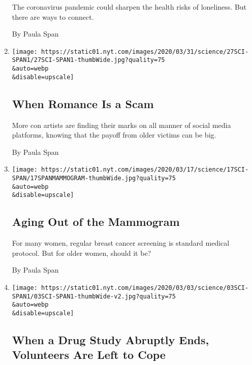 \begin{enumerate}
  The coronavirus pandemic could sharpen the health risks of loneliness.
  But there are ways to connect.

  By Paula Span
\item
  \href{/2020/03/27/well/elderly-romance-scam.html}{}

  \texttt{[image: https://static01.nyt.com/images/2020/03/31/science/27SCI-SPAN1/27SCI-SPAN1-thumbWide.jpg?quality=75\\\&auto=webp\\\&disable=upscale]}

  \hypertarget{when-romance-is-a-scam}{%
  \subsection{When Romance Is a Scam}\label{when-romance-is-a-scam}}

  More con artists are finding their marks on all manner of social media
  platforms, knowing that the payoff from older victims can be big.

  By Paula Span
\item
  \href{/2020/03/16/health/breastcancer-elderly-old-age.html}{}

  \texttt{[image: https://static01.nyt.com/images/2020/03/17/science/17SCI-SPAN/17SPANMAMMOGRAM-thumbWide.jpg?quality=75\\\&auto=webp\\\&disable=upscale]}

  \hypertarget{aging-out-of-the-mammogram}{%
  \subsection{Aging Out of the
  Mammogram}\label{aging-out-of-the-mammogram}}

  For many women, regular breast cancer screening is standard medical
  protocol. But for older women, should it be?

  By Paula Span
\item
  \href{/2020/03/03/health/drug-trial-alzheimers-volunteer.html}{}

  \texttt{[image: https://static01.nyt.com/images/2020/03/03/science/03SCI-SPAN1/03SCI-SPAN1-thumbWide-v2.jpg?quality=75\\\&auto=webp\\\&disable=upscale]}

  \hypertarget{when-a-drug-study-abruptly-ends-volunteers-are-left-to-cope}{%
  \subsection{When a Drug Study Abruptly Ends, Volunteers Are Left to
  Cope}\label{when-a-drug-study-abruptly-ends-volunteers-are-left-to-cope}}


\end{enumerate}
